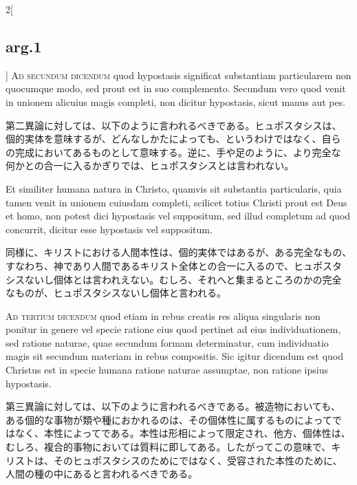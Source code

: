 \documentclass[paper=a4paper,fontsize=10pt,jafontsize=9pt,titlepage]{jlreq}
\begin{document}
\begin{paracol}{2}[\subsection{arg.1}]
{\scshape Ad secundum dicendum} quod hypostasis significat substantiam
particularem non quocumque modo, sed prout est in suo
complemento. Secundum vero quod venit in unionem alicuius magis
completi, non dicitur hypostasis, sicut manus aut pes.

\switchcolumn

第二異論に対しては、以下のように言われるべきである。ヒュポスタシスは、
個的実体を意味するが、どんなしかたによっても、というわけではなく、自ら
の完成においてあるものとして意味する。逆に、手や足のように、より完全な
何かとの合一に入るかぎりでは、ヒュポスタシスとは言われない。

\switchcolumn*

Et similiter humana natura in Christo, quamvis sit substantia
particularis, quia tamen venit in unionem cuiusdam completi, scilicet
totius Christi prout est Deus et homo, non potest dici hypostasis vel
suppositum, sed illud completum ad quod concurrit, dicitur esse
hypostasis vel suppositum.

\switchcolumn

同様に、キリストにおける人間本性は、個的実体ではあるが、ある完全なもの、
すなわち、神であり人間であるキリスト全体との合一に入るので、ヒュポスタ
シスないし個体とは言われえない。むしろ、それへと集まるところのかの完全
なものが、ヒュポスタシスないし個体と言われる。

\switchcolumn*[\subsection{ad.3}]

{\scshape Ad tertium dicendum} quod etiam in rebus creatis res aliqua
singularis non ponitur in genere vel specie ratione eius quod pertinet
ad eius individuationem, sed ratione naturae, quae secundum formam
determinatur, cum individuatio magis sit secundum materiam in rebus
compositis. Sic igitur dicendum est quod Christus est in specie humana
ratione naturae assumptae, non ratione ipsius hypostasis.

\switchcolumn

第三異論に対しては、以下のように言われるべきである。被造物においても、
ある個的な事物が類や種におかれるのは、その個体性に属するものによってで
はなく、本性によってである。本性は形相によって限定され、他方、個体性は、
むしろ、複合的事物においては質料に即してある。したがってこの意味で、キ
リストは、そのヒュポスタシスのためにではなく、受容された本性のために、
人間の種の中にあると言われるべきである。

\end{paracol}
\newpage
\end{document}
